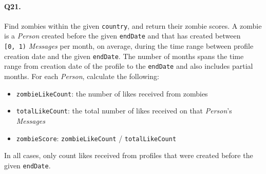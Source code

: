 \paragraph{Q21.}
Find zombies within the given \texttt{country}, and return their zombie
scores.
A zombie is a \emph{Person} created before the given \texttt{endDate}
and that has created between \texttt{{[}0,\ 1)} \emph{Messages} per
month, on average, during the time range between profile creation date
and the given \texttt{endDate}. The number of months spans the time
range from creation date of the profile to the \texttt{endDate} and also
includes partial months.
For each \emph{Person}, calculate the following:
\begin{itemize}
\tightlist
\item
  \texttt{zombieLikeCount}: the number of likes received from zombies
\item
  \texttt{totalLikeCount}: the total number of likes received on that
  \emph{Person}'s \emph{Messages}
\item
  \texttt{zombieScore}: \texttt{zombieLikeCount} /
  \texttt{totalLikeCount}
\end{itemize}
In all cases, only count likes received from profiles that were created
before the given \texttt{endDate}.
